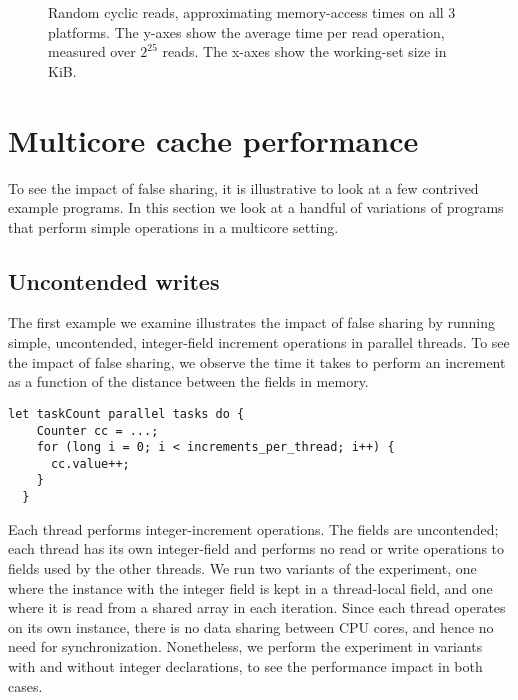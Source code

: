 \begin{figure}[hbpt]
	\graphicspath{{plots/}}
	\begin{subfigure}{1\textwidth}
		
	\end{subfigure}
	\begin{subfigure}{1\textwidth}
		
	\end{subfigure}
	\begin{subfigure}{1\textwidth}
		
	\end{subfigure}
	\caption{Random cyclic reads, approximating memory-access times on all 3
	platforms. The y-axes show the average time per read operation, measured
	over $2^{25}$ reads. The x-axes show the working-set size in KiB.}
	\label{fig:readtimes}
\end{figure}

\section{Multicore cache performance}
\label{sec:contrived}

To see the impact of false sharing, it is illustrative to look at a
few contrived example programs. In this section we look at a handful of
variations of programs that perform simple operations in a multicore
setting.

\subsection{Uncontended writes}
The first example we examine illustrates the impact of false sharing by running
simple, uncontended, integer-field increment operations in parallel threads. To see
the impact of false sharing, we observe the time it takes to perform an
increment as a function of the distance between the fields in memory.

\begin{code}
\begin{Verbatim}[frame=single]
  let taskCount parallel tasks do {
    Counter cc = ...;
    for (long i = 0; i < increments_per_thread; i++) {
      cc.value++;
    }
  }
\end{Verbatim}
	\caption{Simplified code for the local-field version of the uncontended-writes
	experiment.}
	\label{code:uncontended}
\end{code}

Each thread performs integer-increment operations. The fields are
uncontended; each thread has its own integer-field and performs no read or write
operations to fields used by the other threads. We run two variants of the
experiment, one where the  instance with the integer field is kept
in a thread-local field, and one where it is read from a shared array in each
iteration. Since each thread operates on its own  instance, there
is no data sharing between CPU cores, and hence no need for synchronization.
Nonetheless, we perform the experiment in variants with and without
 integer declarations, to see the performance impact in both
cases.


